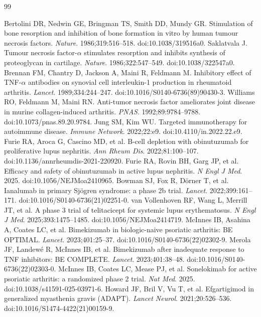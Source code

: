 \documentclass[12pt,a4paper]{article}
\begin{document}
\begin{thebibliography}{99}
 Bertolini DR, Nedwin GE, Bringman TS, Smith DD, Mundy GR. Stimulation of bone resorption and inhibition of bone formation in vitro by human tumour necrosis factors. \textit{Nature}. 1986;319:516--518. doi:10.1038/319516a0.
 Saklatvala J. Tumour necrosis factor-\(\alpha\) stimulates resorption and inhibits synthesis of proteoglycan in cartilage. \textit{Nature}. 1986;322:547--549. doi:10.1038/322547a0.
 Brennan FM, Chantry D, Jackson A, Maini R, Feldmann M. Inhibitory effect of TNF-\(\alpha\) antibodies on synovial cell interleukin-1 production in rheumatoid arthritis. \textit{Lancet}. 1989;334:244--247. doi:10.1016/S0140-6736(89)90430-3.
 Williams RO, Feldmann M, Maini RN. Anti-tumor necrosis factor ameliorates joint disease in murine collagen-induced arthritis. \textit{PNAS}. 1992;89:9784--9788. doi:10.1073/pnas.89.20.9784.
 Jung SM, Kim WU. Targeted immunotherapy for autoimmune disease. \textit{Immune Network}. 2022;22:e9. doi:10.4110/in.2022.22.e9.
 Furie RA, Aroca G, Cascino MD, et al. B-cell depletion with obinutuzumab for proliferative lupus nephritis. \textit{Ann Rheum Dis}. 2022;81:100--107. doi:10.1136/annrheumdis-2021-220920.
 Furie RA, Rovin BH, Garg JP, et al. Efficacy and safety of obinutuzumab in active lupus nephritis. \textit{N Engl J Med}. 2025. doi:10.1056/NEJMoa2410965.
 Bowman SJ, Fox R, Dörner T, et al. Ianalumab in primary Sjögren syndrome: a phase 2b trial. \textit{Lancet}. 2022;399:161--171. doi:10.1016/S0140-6736(21)02251-0.
 van Vollenhoven RF, Wang L, Merrill JT, et al. A phase 3 trial of telitacicept for systemic lupus erythematosus. \textit{N Engl J Med}. 2025;393:1475--1485. doi:10.1056/NEJMoa2414719.
 McInnes IB, Asahina A, Coates LC, et al. Bimekizumab in biologic-naive psoriatic arthritis: BE OPTIMAL. \textit{Lancet}. 2023;401:25--37. doi:10.1016/S0140-6736(22)02302-9.
 Merola JF, Landewé R, McInnes IB, et al. Bimekizumab after inadequate response to TNF inhibitors: BE COMPLETE. \textit{Lancet}. 2023;401:38--48. doi:10.1016/S0140-6736(22)02303-0.
 McInnes IB, Coates LC, Mease PJ, et al. Sonelokimab for active psoriatic arthritis: a randomized phase 2 trial. \textit{Nat Med}. 2025. doi:10.1038/s41591-025-03971-6.
 Howard JF, Bril V, Vu T, et al. Efgartigimod in generalized myasthenia gravis (ADAPT). \textit{Lancet Neurol}. 2021;20:526--536. doi:10.1016/S1474-4422(21)00159-9.

\end{thebibliography}
\end{document}
